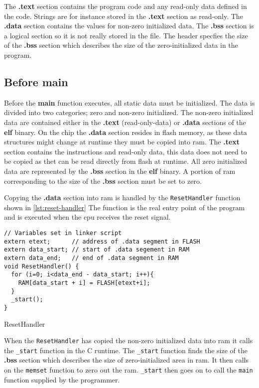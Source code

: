 The \textbf{.text} section contains the program code and any read-only data defined in the code.
Strings are for instance stored in the \textbf{.text} section as read-only.
The \textbf{.data} section contains the values for non-zero initialized data.
The \textbf{.bss} section is a logical section so it is not really stored in the file.
The header specfies the size of the \textbf{.bss} section which describes the size of the zero-initialized data in the program.

\subsection{Before main}
\label{sec:before-main}
Before the \textbf{main} function executes, all static data must be initialized.
The data is divided into two categories; zero and non-zero initialized.
The non-zero initialized data are contained either in the \textbf{.text} (read-only-data) or \textbf{.data} sections of the \textbf{elf} binary.
On the chip the \textbf{.data} section resides in flash memory, as these data structures might change at runtime they must be copied into \gls{ram}.
The \textbf{.text} section contains the instructions and read-only data, this data does not need to be copied as thet can be read directly from flash at runtime.
All zero initialized data are represented by the \textbf{.bss} section in the \textbf{elf} binary.
A portion of \gls{ram} corresponding to the size of the \textbf{.bss} section must be set to zero.

Copying the \textbf{.data} section into \gls{ram} is handled by the \texttt{ResetHandler} function shown in \autoref{lst:reset-handler}
The function is the real entry point of the program and is executed when the \gls{cpu} receives the reset signal.

\begin{listing}[H]
\begin{verbatim}
// Variables set in linker script
extern etext;      // address of .data segment in FLASH
extern data_start; // start of .data segement in RAM
extern data_end;   // end of .data segment in RAM
void ResetHandler() {
  for (i=0; i<data_end - data_start; i++){
    RAM[data_start + i] = FLASH[etext+i];
  }
  _start();
}
\end{verbatim}
\caption{ResetHandler}
\label{lst:reset-handler}
\end{listing}

When the \texttt{ResetHandler} has copied the non-zero initialized data into \gls{ram} it calls the \texttt{\_start} function in the C runtime.
The \texttt{\_start} function finds the size of the \textbf{.bss} section which describes the size of zero-initialized area in \gls{ram}.
It then calls on the \texttt{memset} function to zero out the \gls{ram}.
\texttt{\_start} then goes on to call the \texttt{main} function supplied by the programmer.

